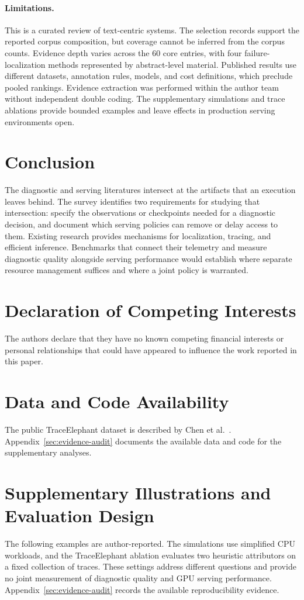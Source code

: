 \documentclass[preprint,12pt]{elsarticle}
\begin{document}
\paragraph{Limitations.}
This is a curated review of text-centric systems. The selection records support the reported corpus composition, but coverage cannot be inferred from the corpus counts. Evidence depth varies across the 60 core entries, with four failure-localization methods represented by abstract-level material. Published results use different datasets, annotation rules, models, and cost definitions, which preclude pooled rankings. Evidence extraction was performed within the author team without independent double coding. The supplementary simulations and trace ablations provide bounded examples and leave effects in production serving environments open.

\section{Conclusion}
The diagnostic and serving literatures intersect at the artifacts that an execution leaves behind. The survey identifies two requirements for studying that intersection: specify the observations or checkpoints needed for a diagnostic decision, and document which serving policies can remove or delay access to them. Existing research provides mechanisms for localization, tracing, and efficient inference. Benchmarks that connect their telemetry and measure diagnostic quality alongside serving performance would establish where separate resource management suffices and where a joint policy is warranted.


\section*{Declaration of Competing Interests}
The authors declare that they have no known competing financial interests or personal relationships that could have appeared to influence the work reported in this paper.


\section*{Data and Code Availability}
The public TraceElephant dataset is described by Chen et al.\ \cite{v5ref6}. Appendix~\ref{sec:evidence-audit} documents the available data and code for the supplementary analyses.


\appendix
\section{Supplementary Illustrations and Evaluation Design}\label{app:illustrations}
The following examples are author-reported. The simulations use simplified CPU workloads, and the TraceElephant ablation evaluates two heuristic attributors on a fixed collection of traces. These settings address different questions and provide no joint measurement of diagnostic quality and GPU serving performance. Appendix~\ref{sec:evidence-audit} records the available reproducibility evidence.
\end{document}
